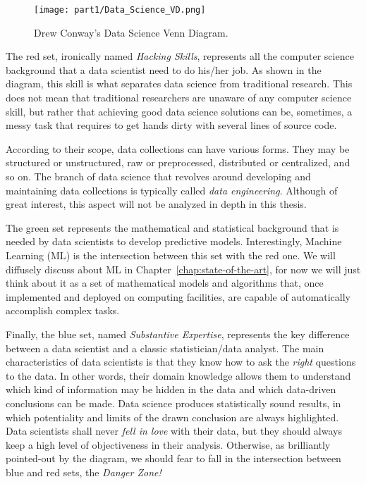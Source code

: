 \begin{figure}[h!]
	\centering
	\texttt{[image: part1/Data\_Science\_VD.png]}
	\caption{Drew Conway's Data Science Venn Diagram.} \label{fig:data_science_venn_diagram}
\end{figure}

The red set, ironically named \textit{Hacking Skills}, represents all the computer science background that a data scientist need to do his/her job. As shown in the diagram, this  skill is what separates data science from traditional research. This does not mean that traditional researchers are unaware of any computer science skill, but rather that achieving good data science solutions can be, sometimes, a messy task that requires to get hands dirty with several lines of source code.


According to their scope, data collections can have various forms. They may be structured or unstructured, raw or preprocessed, distributed or centralized, and so on. The branch of data science that revolves around developing and maintaining data collections is typically called \textit{data engineering}. Although of great interest, this aspect will not be analyzed in depth in this thesis.

The green set represents the mathematical and statistical background that is needed by data scientists to develop predictive models. Interestingly, Machine Learning (\ac{ML}) is the intersection between this set with the red one. We will diffusely discuss about ML in Chapter~\ref{chap:state-of-the-art}, for now we will just think about it as a set of mathematical models and algorithms that, once implemented and deployed on computing facilities, are capable of automatically accomplish complex tasks.

Finally, the blue set, named \textit{Substantive Expertise}, represents the key difference between a data scientist and a classic statistician/data analyst. The main characteristics of data scientists is that they know how to ask the \textit{right} questions to the data. In other words, their domain knowledge allows them to understand which kind of information may be hidden in the data and which data-driven conclusions can be made. Data science produces statistically sound results, in which potentiality and limits of the drawn conclusion are always highlighted. Data scientists shall never \textit{fell in love} with their data, but they should always keep a high level of objectiveness in their analysis. Otherwise, as brilliantly pointed-out by the diagram, we should fear to fall in the intersection between blue and red sets, the \textit{Danger Zone!}


